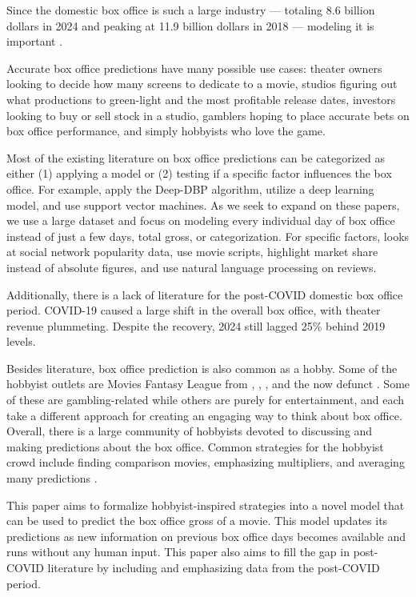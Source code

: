 \documentclass[12pt]{article}
\begin{document}
Since the domestic box office is such a large industry — totaling 8.6 billion dollars in 2024 and peaking at 11.9 billion dollars in 2018 — modeling it is important \citep{bomYearly}.

Accurate box office predictions have many possible use cases: theater owners looking to decide how many screens to dedicate to a movie, studios figuring out what productions to green-light and the most profitable release dates, investors looking to buy or sell stock in a studio, gamblers hoping to place accurate bets on box office performance, and simply hobbyists who love the game.

Most of the existing literature on box office predictions can be categorized as either (1) applying a model or (2) testing if a specific factor influences the box office. For example, \cite{dailyNeuralNetwork} apply the Deep-DBP algorithm, \cite{deeplearning} utilize a deep learning model, and 
\cite{svm} use support vector machines. As we seek to expand on these papers, we use a large dataset and focus on modeling every individual day of box office instead of just a few days, total gross, or categorization.
For specific factors, \cite{socialNetworkService} looks at social network popularity data, \cite{assessingBoxOffice} use movie scripts, \cite{modelingLifeCycles} highlight market share instead of absolute figures, and \cite{reviewsForetell} use natural language processing on reviews.

Additionally, there is a lack of literature for the post-COVID domestic box office period. COVID-19 caused a large shift in the overall box office, with theater revenue plummeting. Despite the recovery, 2024 still lagged 25\% behind 2019 levels.

Besides literature, box office prediction is also common as a hobby. Some of the hobbyist outlets are Movies Fantasy League from \citet{vultureMoviesLeague}, \cite{hsxHome}, \cite{polymarketHighestGrossing}, and the now defunct \cite{fmlHome}. Some of these are gambling-related while others are purely for entertainment, and each take a different approach for creating an engaging way to think about box office. Overall, there is a large community of hobbyists devoted to discussing and making predictions about the box office. Common strategies for the hobbyist crowd include finding comparison movies, emphasizing multipliers, and averaging many predictions \citep{resistanceLineup,previewsSheet,boxofficetheory}. 

This paper aims to formalize hobbyist-inspired strategies into a novel model that can be used to predict the box office gross of a movie. This model updates its predictions as new information on previous box office days becomes available and runs without any human input. This paper also aims to fill the gap in post-COVID literature by including and emphasizing data from the post-COVID period.
\end{document}
